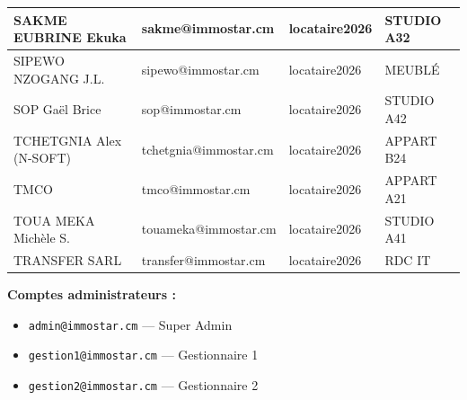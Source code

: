 \documentclass[a4paper,11pt]{article}
\begin{document}
\begin{longtable}{|p{4cm}|p{4.5cm}|p{3.5cm}|p{3cm}|}
SAKME EUBRINE Ekuka & sakme@immostar.cm & locataire2026 & STUDIO A32 \\
\hline
SIPEWO NZOGANG J.L. & sipewo@immostar.cm & locataire2026 & MEUBLÉ \\
\hline
SOP Gaël Brice & sop@immostar.cm & locataire2026 & STUDIO A42 \\
\hline
TCHETGNIA Alex (N-SOFT) & tchetgnia@immostar.cm & locataire2026 & APPART B24 \\
\hline
TMCO & tmco@immostar.cm & locataire2026 & APPART A21 \\
\hline
TOUA MEKA Michèle S. & touameka@immostar.cm & locataire2026 & STUDIO A41 \\
\hline
TRANSFER SARL & transfer@immostar.cm & locataire2026 & RDC IT \\
\hline
\end{longtable}

\vspace{1cm}
\noindent\textbf{Comptes administrateurs :}
\begin{itemize}
  \item \texttt{admin@immostar.cm} — Super Admin
  \item \texttt{gestion1@immostar.cm} — Gestionnaire 1
  \item \texttt{gestion2@immostar.cm} — Gestionnaire 2
\end{itemize}
\end{document}
